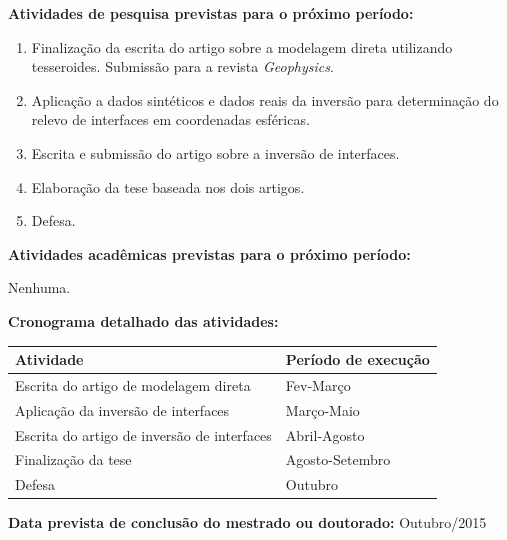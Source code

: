 \documentclass[12pt,a4paper]{article}
\begin{document}
\begin{flushleft}

\textbf{Atividades de pesquisa previstas para o próximo período:}

\begin{enumerate}
    \item Finalização da escrita do artigo sobre a modelagem direta utilizando
        tesseroides. Submissão para a revista \textit{Geophysics}.
    \item Aplicação a dados sintéticos e dados reais da inversão para
        determinação do relevo de interfaces em coordenadas esféricas.
    \item Escrita e submissão do artigo sobre a inversão de interfaces.
    \item Elaboração da tese baseada nos dois artigos.
    \item Defesa.
\end{enumerate}

\textbf{Atividades acadêmicas previstas para o próximo período:}

\bigskip

Nenhuma.

\bigskip

\textbf{Cronograma detalhado das atividades:}

\begin{center}
\begin{tabular}{ll}
    \toprule
    \textbf{Atividade} & \textbf{Período de execução} \\
    \midrule
    Escrita do artigo de modelagem direta & Fev-Março\\
    Aplicação da inversão de interfaces & Março-Maio\\
    Escrita do artigo de inversão de interfaces & Abril-Agosto\\
    Finalização da tese & Agosto-Setembro\\
    Defesa & Outubro\\
    \bottomrule
\end{tabular}
\end{center}


\bigskip

\textbf{Data prevista de conclusão do mestrado ou doutorado:} Outubro/2015

\end{flushleft}
\end{document}
